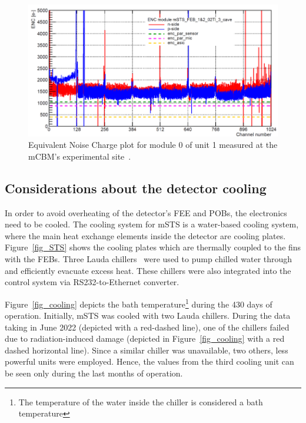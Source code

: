 \begin{figure}[!h]
\centering
\includegraphics[width=0.95\columnwidth]{Chapter6/DCS/images/U1M1_ENC.png}
\caption{Equivalent Noise Charge plot for module 0 of unit 1 measured at the \gls{mCBM}'s experimental site~\cite{RodriguezRodriguez2020}.}
\label{fig_msts_ENC2}
\end{figure}


\subsection{Considerations about the detector cooling}
\label{msts_cooling}
In order to avoid overheating of the detector's \gls{FEE} and \glspl{POB}, the electronics need to be cooled. The cooling system for \gls{mSTS} is a water-based cooling system, where the main heat exchange elements inside the detector are cooling plates.  Figure~\ref{fig_STS} shows the cooling plates which are thermally coupled to the fins with the \glspl{FEB}. Three Lauda chillers~\cite{Lauda1} were used to pump chilled water through and efficiently evacuate excess heat. These chillers were also integrated into the control system via RS232-to-Ethernet converter.

Figure~\ref{fig_cooling} depicts the bath temperature\footnote{The temperature of the water inside the chiller is considered a bath temperature} during the 430 days of operation. Initially, \gls{mSTS} was cooled with two Lauda chillers. During the data taking in June 2022 (depicted with a red-dashed line), one of the chillers failed due to radiation-induced damage (depicted in Figure~\ref{fig_cooling} with a red dashed horizontal line). Since a similar chiller was unavailable, two others, less powerful units were employed. Hence, the values from the third cooling unit can be seen only during the last months of operation. 

